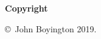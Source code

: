 
\newpage

\thispagestyle{empty}

\vspace*{0.9cm}

\begin{center}

{\bf \Huge Copyright}

\vspace{1cm}


   \Large\copyright\  John Boyington 2019.\\

   \vspace{0.5cm}


\end{center}

